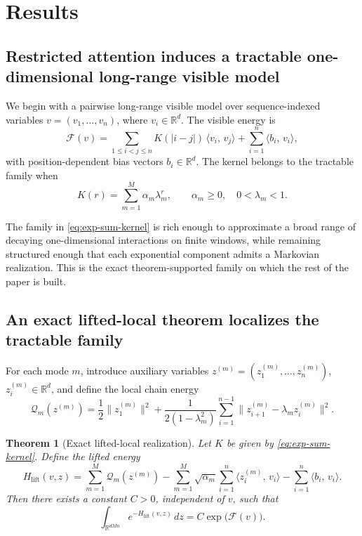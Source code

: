 \documentclass[11pt]{article}
\newtheorem{theorem}{Theorem}
\theoremstyle{definition}
\newcommand{\R}{\mathbb{R}}
\newcommand{\ip}[2]{\langle #1,\, #2 \rangle}
\begin{document}
\section*{Results}

\subsection*{Restricted attention induces a tractable one-dimensional long-range visible model}

We begin with a pairwise long-range visible model over sequence-indexed variables \(v=(v_1,\dots,v_n)\), where \(v_i\in\R^d\). The visible energy is
\begin{equation}
\mathcal F(v)
=
\sum_{1\le i<j\le n} K(|i-j|)\,\ip{v_i}{v_j}
+\sum_{i=1}^{n}\ip{b_i}{v_i},
\label{eq:visible-energy}
\end{equation}
with position-dependent bias vectors \(b_i\in\R^d\). The kernel belongs to the tractable family when
\begin{equation}
K(r)=\sum_{m=1}^{M}\alpha_m \lambda_m^r,
\qquad
\alpha_m\ge 0,\quad 0<\lambda_m<1.
\label{eq:exp-sum-kernel}
\end{equation}

The family in \eqref{eq:exp-sum-kernel} is rich enough to approximate a broad range of decaying one-dimensional interactions on finite windows, while remaining structured enough that each exponential component admits a Markovian realization. This is the exact theorem-supported family on which the rest of the paper is built.

\subsection*{An exact lifted-local theorem localizes the tractable family}

For each mode \(m\), introduce auxiliary variables \(z^{(m)}=(z_1^{(m)},\dots,z_n^{(m)})\), \(z_i^{(m)}\in\R^d\), and define the local chain energy
\begin{equation}
\mathcal Q_m(z^{(m)})
=
\frac12\|z_1^{(m)}\|^2
+
\frac{1}{2(1-\lambda_m^2)}
\sum_{i=1}^{n-1}\|z_{i+1}^{(m)}-\lambda_m z_i^{(m)}\|^2.
\label{eq:mode-chain-energy}
\end{equation}

\begin{theorem}[Exact lifted-local realization]
\label{thm:lifted-local-exact}
Let \(K\) be given by \eqref{eq:exp-sum-kernel}. Define the lifted energy
\begin{equation}
H_{\mathrm{lift}}(v,z)
=
\sum_{m=1}^{M}\mathcal Q_m(z^{(m)})
-
\sum_{m=1}^{M}\sqrt{\alpha_m}\sum_{i=1}^{n}\ip{z_i^{(m)}}{v_i}
-
\sum_{i=1}^{n}\ip{b_i}{v_i}.
\label{eq:lifted-hamiltonian}
\end{equation}
Then there exists a constant \(C>0\), independent of \(v\), such that
\begin{equation}
\int_{\R^{dMn}} e^{-H_{\mathrm{lift}}(v,z)}\,dz
=
C\exp\!\bigl(\mathcal F(v)\bigr).
\label{eq:lifted-marginal}
\end{equation}
\end{theorem}
\end{document}
